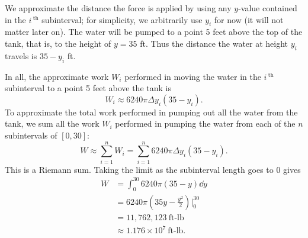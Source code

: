 \begin{example}
We approximate the distance the force is applied by using any $y$-value contained in the $i\,^\text{th}$ subinterval; for simplicity, we arbitrarily use $y_i$ for now (it will not matter later on). The water will be pumped to a point 5 feet above the top of the tank, that is, to the height of $y=35$ ft. Thus the distance the water at height $y_i$ travels is $35-y_i$ ft. 

In all, the approximate work $W_i$ performed in moving the water in the $i\,^\text{th}$ subinterval to a point 5 feet above the tank is 
\[W_i \approx 6240\pi\Delta y_i(35-y_i).\]
To approximate the total work performed in pumping out all the water from the tank, we sum all the work $W_i$ performed in pumping the water from each of the $n$ subintervals of $[0,30]$:
\[W \approx \sum_{i=1}^n W_i = \sum_{i=1}^n 6240\pi\Delta y_i(35-y_i).\]
This is a Riemann sum. Taking the limit as the subinterval length goes to 0 gives 
\begin{align*}
W 	&=	\int_0^{30} 6240\pi(35-y)\dd y \\
		&=  6240\pi\left(35y-\frac{y^2}2\right)\Big|_0^{30} \\
		&= 	11,762,123 \ \text{ft-lb}\\
		&\approx  1.176 \times 10^7 \ \text{ft-lb}.
\end{align*}
\end{example}



